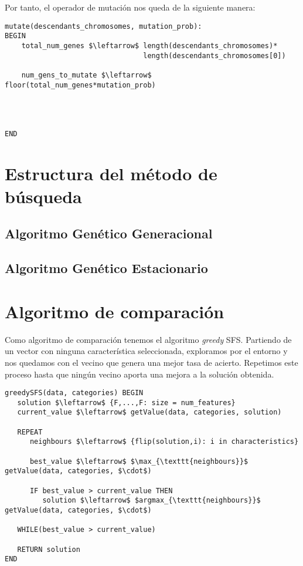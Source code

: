 \documentclass[11pt,leqno]{article}
\begin{document}
	Por tanto, el operador de mutación nos queda de la siguiente manera:
	
\begin{lstlisting}[mathescape=true]
mutate(descendants_chromosomes, mutation_prob):
BEGIN
	total_num_genes $\leftarrow$ length(descendants_chromosomes)* 
                                 length(descendants_chromosomes[0])
                                 
    num_gens_to_mutate $\leftarrow$ floor(total_num_genes*mutation_prob)
    
    
	
	
END
\end{lstlisting}
	

\section{Estructura del método de búsqueda}

\subsection{Algoritmo Genético Generacional}


\subsection{Algoritmo Genético Estacionario}

	
\section{Algoritmo de comparación}

Como algoritmo de comparación tenemos el algoritmo \textit{greedy} SFS. Partiendo de un vector con ninguna característica seleccionada, exploramos por el entorno y nos quedamos con el vecino que genera una mejor tasa de acierto. Repetimos este proceso hasta que ningún vecino aporta una mejora a la solución obtenida.

	\begin{lstlisting}[mathescape=true]
greedySFS(data, categories) BEGIN
   solution $\leftarrow$ {F,...,F: size = num_features}
   current_value $\leftarrow$ getValue(data, categories, solution)
   
   REPEAT
      neighbours $\leftarrow$ {flip(solution,i): i in characteristics}
   
      best_value $\leftarrow$ $\max_{\texttt{neighbours}}$ getValue(data, categories, $\cdot$)
      
      IF best_value > current_value THEN
         solution $\leftarrow$ $argmax_{\texttt{neighbours}}$ getValue(data, categories, $\cdot$)
   
   WHILE(best_value > current_value)
   
   RETURN solution
END
	\end{lstlisting}
\end{document}
